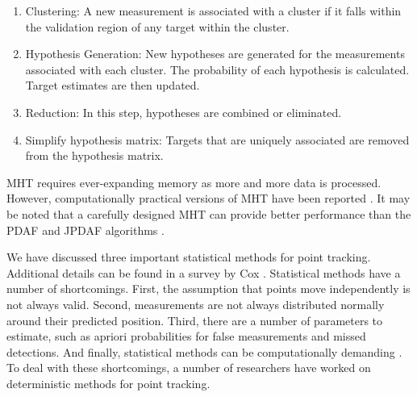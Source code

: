 \documentclass[12pt,letterpaper,doublespaced,ETD,proposal]{gt-ece-thesis}
\begin{document}
\begin{Body}
\begin{enumerate}
\begin{enumerate}
\item Clustering: A new measurement is associated with a cluster if it falls within the validation region of any target within the cluster.
\item Hypothesis Generation: New hypotheses are generated for the measurements associated with each cluster.  The probability of each hypothesis is calculated.  Target estimates are then updated.
\item Reduction: In this step, hypotheses are combined or eliminated.
\item Simplify hypothesis matrix: Targets that are uniquely associated are removed from the hypothesis matrix.
\end{enumerate}

MHT requires ever-expanding memory as more and more data is processed.  However, computationally practical versions of MHT have been reported \cite{1996_JNL_EfficientMHT_Cox, 1994_CNF_MLPMHT_Streit}.  It may be noted that a carefully designed MHT can provide better performance than the PDAF and JPDAF algorithms \cite{2009_JNL_PDAF_Barshalom}.  
\end{enumerate}

We have discussed three important statistical methods for point tracking.  Additional details can be found in a survey by Cox \cite{1993_JNL_SURVEYdataAssociation_Cox}.  Statistical methods have a number of shortcomings.  First, the assumption that points move independently is not always valid.  Second, measurements are not always distributed normally around their predicted position.  Third, there are a number of parameters to estimate, such as apriori probabilities for false measurements and missed detections.  And finally, statistical methods can be computationally demanding \cite{2001_JNL_MotionCorrespondence_Veenman}.  To deal with these shortcomings, a number of researchers have worked on deterministic methods for point tracking.


\end{Body}
\end{document}
